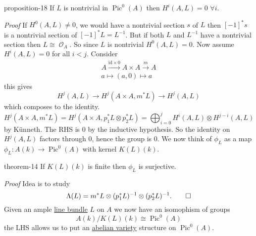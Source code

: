 \documentclass[10pt,]{book}
\makeatletter
\renewcommand*{\proofname}{Proof}
\renewenvironment{proof}[1][\proofname]{\par
  \pushQED{\qed}%
  \normalfont \topsep6\p@\@plus6\p@\relax
  \trivlist
  \item\relax
    {\itshape
    #1\@addpunct{.}}\hspace\labelsep\ignorespaces
}{%
  \popQED\endtrivlist\@endpefalse
}
\numberwithin{equation}{section}
\newcommand{\sheaf}[1]{\operatorname{\mathcal{#1}}}
\newcommand{\lb}{[}
\newcommand{\rb}{]}
\newcommand{\id}{\mathrm{id}}
\DeclareMathOperator{\Pic}{Pic}
\newcommand{\lt}{<}
\makeatother
\begin{document}
\begin{proposition}{}{}{proposition-18}%
\hypertarget{p-184}{}%
If \(L\) is nontrivial in \(\Pic^0(A)\) then \(H^i(A,L) = 0\) \(\forall i\).%
\end{proposition}
\begin{proof}\hypertarget{proof-35}{}
\hypertarget{p-185}{}%
If \(H^0(A,L) \ne 0\), we would have  a nontrivial section \(s\) of \(L\) then \(\lb -1\rb ^* s\) is   a nontrivial section of \(\lb-1\rb^* L = L^{-1}\). But if both \(L\) and \(L^{-1}\) have  a nontrivial section then \(L \cong \sheaf O_A\). So since \(L\) is nontrivial \(H^0(A,L) = 0\). Now assume \(H^i(A,L) = 0\) for all \(i\lt j\). Consider%
\begin{gather*}
A\xrightarrow{\id \times 0} A\times A \xrightarrow m A\\
a\mapsto (a,0)\mapsto a
\end{gather*}
this gives%
\begin{equation*}
H^j(A, L) \to H^j(A\times A, m^*L) \to H^j(A,L)
\end{equation*}
which composes to the identity.%
\begin{equation*}
H^j(A\times A, m^*L) =  H^j(A\times A, p_1^*L \otimes p_2^*L) = \bigoplus_{i=0}^j H^i(A,L) \otimes H^{j-i}(A,L)
\end{equation*}
by Künneth. The RHS is 0 by the inductive hypothesis. So the identity on \(H^j(A,L)\) factors through 0, hence the group is 0.%
\end{proof}
\hypertarget{p-186}{}%
We now think of \(\phi_L\) as a map \(\phi_L \colon A(k) \to \Pic^0(A)\) with kernel \(K(L) (k)\).%
\begin{theorem}{}{}{theorem-14}%
\hypertarget{p-187}{}%
If \(K(L)(k)\) is finite then \(\phi_L\) is surjective.%
\end{theorem}
\begin{proof}\hypertarget{proof-36}{}
\hypertarget{p-188}{}%
Idea is to study%
\begin{equation*}
\Lambda (L) =  m^* L \otimes (p_1^* L)^{-1} \otimes (p_2^* L)^{-1}\text{.}\qedhere
\end{equation*}
%
\end{proof}
\hypertarget{p-189}{}%
Given an ample \hyperref[def-line-bundle]{line bundle} \(L\) on \(A\) we now have an isomophism of groups%
\begin{equation*}
A(k)/K(L)(k) \cong \Pic^0(A)
\end{equation*}
the LHS allows us to put an \hyperref[def-buntes-abvar]{abelian variety} structure on \(\Pic^0(A)\).%
%
%
\typeout{************************************************}
\typeout{************************************************}
%
\end{document}
